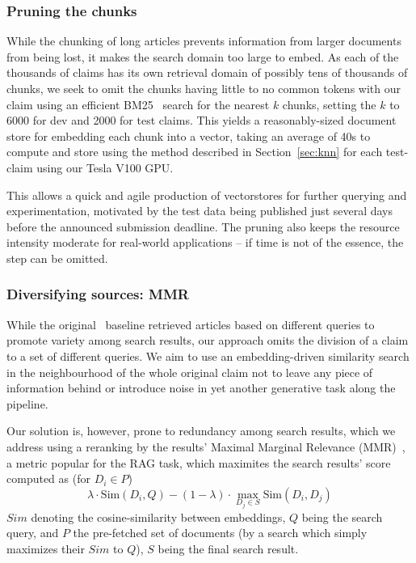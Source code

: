 \subsubsection{Pruning the chunks}
While the chunking of long articles prevents information from larger documents from being lost, it makes the search domain too large to embed.
As each of the thousands of claims has its own retrieval domain of possibly tens of thousands of chunks, we seek to omit the chunks having little to no common tokens with our claim using an efficient BM25~\cite{bm25} search for the nearest $k$ chunks, setting the $k$ to 6000 for dev and 2000 for test claims. 
This yields a reasonably-sized document store for embedding each chunk into a vector, taking an average of 40s to compute and store using the method described in Section~\ref{sec:knn} for each test-claim using our Tesla V100 GPU.

This allows a quick and agile production of vectorstores for further querying and experimentation, motivated by the \averitec{}  test data being published just several days before the announced submission deadline.
The pruning also keeps the resource intensity moderate for real-world applications -- if time is not of the essence, the step can be omitted.

\subsubsection{Diversifying sources: MMR}
While the original~\cite{averitec2024} baseline retrieved articles based on different queries to promote variety among search results, our approach omits the division of a claim to a set of different queries.
We aim to use an embedding-driven similarity search in the neighbourhood of the whole original claim not to leave any piece of information behind or introduce noise in yet another generative task along the pipeline.

Our solution is, however, prone to redundancy among search results, which we address using a reranking by the results' Maximal Marginal Relevance (MMR)~\cite{carbonell-mmr}, a metric popular for the RAG task, which maximites the search results' score computed as (for $D_i\in P$)
$$\lambda \cdot \mathrm{Sim}(D_i, Q) - (1-\lambda) \cdot \max_{D_j \in S} \mathrm{Sim}(D_i, D_j)$$
$Sim$ denoting the cosine-similarity between embeddings, $Q$ being the search query, and $P$ the pre-fetched set of documents (by a search which simply maximizes their $Sim$ to $Q$), $S$ being the final search result.

